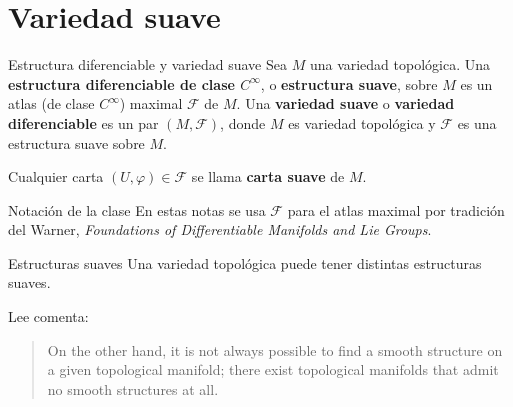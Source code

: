\section{Variedad suave}
\begin{bookdefinition}{Estructura diferenciable y variedad suave}
Sea $M$ una variedad topológica. Una \textbf{estructura diferenciable de clase $C^\infty$}, o \textbf{estructura suave}, sobre $M$ es un atlas (de clase $C^{\infty}$) maximal $\mathcal{F}$ de $M$. Una \textbf{variedad suave} o \textbf{variedad diferenciable} es un par $(M,\mathcal{F})$, donde $M$ es variedad topológica y $\mathcal{F}$ es una estructura suave sobre $M$.

Cualquier carta $(U,\varphi)\in\mathcal{F}$ se llama \textbf{carta suave} de $M$.

\end{bookdefinition}
\begin{bookremark}{Notación de la clase}
En estas notas se usa $\mathcal{F}$ para el atlas maximal por tradición del Warner, \emph{Foundations of Differentiable Manifolds and Lie Groups}.

\end{bookremark}
\begin{bookremark}{Estructuras suaves}
Una variedad topológica puede tener distintas estructuras suaves.

Lee comenta:

\begin{quote}
On the other hand, it is not always possible to find a smooth structure on a given topological manifold; there exist topological manifolds that admit no smooth structures at all.

\end{quote}
\end{bookremark}
